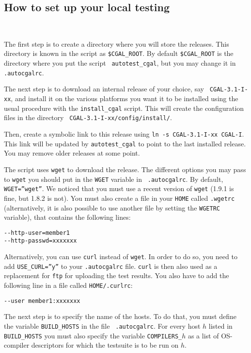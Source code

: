 \subsection{How to set up your local testing} ~

The first step is to create a directory where you will store the releases.
This directory is known in the script as {\tt \$CGAL\_ROOT}. By default
{\tt \$CGAL\_ROOT} is the directory where you put the script {\tt
autotest\_cgal}, but you may change it in {\tt .autocgalrc}.

The next step is to download an internal release of your choice, say {\tt
CGAL-3.1-I-xx}, and install it on the various platforms you want it to be
installed using the usual procedure with the {\tt install\_cgal} script.
This will create the configuration files in the directory {\tt
CGAL-3.1-I-xx/config/install/}.

Then, create a symbolic link to this release using {\tt ln -s CGAL-3.1-I-xx
CGAL-I}. This link will be updated by {\tt autotest\_cgal} to point to the
last installed release.  You may remove older releases at some point.

The script uses {\tt wget} to download the release. The different options you
may pass to {\tt wget} you should put in the {\tt WGET} variable in {\tt
.autocgalrc}. By default, {\tt WGET=''wget''}. We noticed that you must use
a recent version of {\tt wget} (1.9.1 is fine, but 1.8.2 is not). You must
also create a file in your {\tt HOME} called {\tt .wgetrc} (alternatively,
it is also possible to use another file by setting the {\tt WGETRC} variable),
that contains the following lines:
\begin{verbatim}
--http-user=member1
--http-passwd=xxxxxxx
\end{verbatim}

Alternatively, you can use {\tt curl} instead of {\tt wget}.  In order to
do so, you need to add {\tt USE\_CURL=''y''} to your {\tt .autocgalrc} file.
{\tt curl} is then also used as a replacement for {\tt ftp} for uploading the
test results.
You also have to add the following line in a file called {\tt HOME/.curlrc}:
\begin{verbatim}
--user member1:xxxxxxx
\end{verbatim}

The next step is to specify the name of the hosts. To do that, you
must define the variable \texttt{BUILD\_HOSTS} in the file {\tt
  .autocgalrc}. For every host $h$ listed in \texttt{BUILD\_HOSTS} you
must also specify the variable \texttt{COMPILERS\_$h$} as a list of
OS-compiler descriptors for which the testsuite is to be run on $h$.

